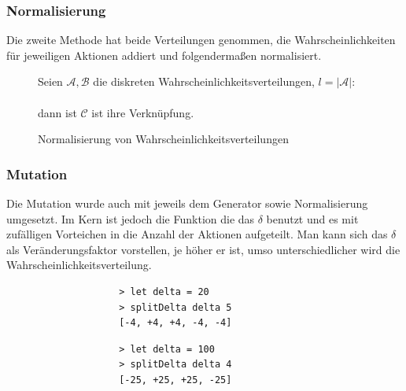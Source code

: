             \subsubsection*{Normalisierung}
            Die zweite Methode hat beide Verteilungen genommen, die Wahrscheinlichkeiten für jeweiligen Aktionen addiert und folgendermaßen normalisiert.\\
            \noindent
            \begin{figure}[H]
                \begin{mdframed}
                    Seien $\mathcal{A, B}$ die diskreten Wahrscheinlichkeitsverteilungen, $l = |\mathcal{A}|$:\\[4mm]
                    \hspace*{40mm} \\[4mm]
                    dann ist $\mathcal{C}$ ist ihre Verknüpfung.
                \end{mdframed}
                \caption{\label{norm-prop} Normalisierung von Wahrscheinlichkeitsverteilungen}
            \end{figure}

            \subsubsection*{Mutation}
            Die Mutation wurde auch mit jeweils dem Generator sowie Normalisierung umgesetzt. Im Kern ist jedoch die Funktion die das $\delta$ benutzt und es mit zufälligen Vorteichen in die Anzahl der Aktionen aufgeteilt. Man kann sich das $\delta$ als Veränderungsfaktor vorstellen, je höher er ist, umso unterschiedlicher wird die Wahrscheinlichkeitsverteilung.
            \begin{mdframed}
            \begin{multicols}{2}
                \begin{verbatim}
                    > let delta = 20
                    > splitDelta delta 5
                    [-4, +4, +4, -4, -4]
                \end{verbatim}
                \begin{verbatim}
                    > let delta = 100
                    > splitDelta delta 4
                    [-25, +25, +25, -25]
                \end{verbatim}
            \end{multicols}
            \end{mdframed}
